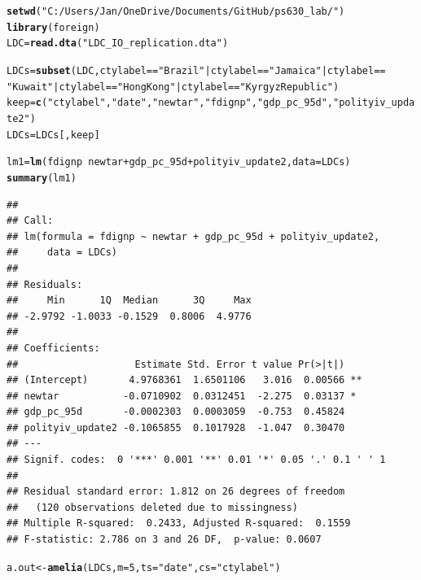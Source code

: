 \documentclass[12pt]{article}\usepackage[]{graphicx}\usepackage[]{color}
\makeatletter
\newcommand{\hlnum}[1]{\textcolor[rgb]{0.686,0.059,0.569}{#1}}%
\newcommand{\hlstr}[1]{\textcolor[rgb]{0.192,0.494,0.8}{#1}}%
\newcommand{\hlopt}[1]{\textcolor[rgb]{0,0,0}{#1}}%
\newcommand{\hlstd}[1]{\textcolor[rgb]{0.345,0.345,0.345}{#1}}%
\newcommand{\hlkwb}[1]{\textcolor[rgb]{0.69,0.353,0.396}{#1}}%
\newcommand{\hlkwc}[1]{\textcolor[rgb]{0.333,0.667,0.333}{#1}}%
\newcommand{\hlkwd}[1]{\textcolor[rgb]{0.737,0.353,0.396}{\textbf{#1}}}%
\newenvironment{kframe}{%
 \def\at@end@of@kframe{}%
 \ifinner\ifhmode%
  \def\at@end@of@kframe{\end{minipage}}%
  \begin{minipage}{\columnwidth}%
 \fi\fi%
 \def\FrameCommand##1{\hskip\@totalleftmargin \hskip-\fboxsep
 \colorbox{shadecolor}{##1}\hskip-\fboxsep
     \hskip-\linewidth \hskip-\@totalleftmargin \hskip\columnwidth}%
 \MakeFramed {\advance\hsize-\width
   \@totalleftmargin\z@ \linewidth\hsize
   \@setminipage}}%
 {\par\unskip\endMakeFramed%
 \at@end@of@kframe}
\newenvironment{knitrout}{}{} %
\makeatother
\begin{document}
\begin{knitrout}
\color{fgcolor}\begin{kframe}
\begin{alltt}
\hlkwd{setwd}\hlstd{(}\hlstr{"C:/Users/Jan/OneDrive/Documents/GitHub/ps630_lab/"}\hlstd{)}
\hlkwd{library}\hlstd{(foreign)}
\hlstd{LDC} \hlkwb{=} \hlkwd{read.dta}\hlstd{(}\hlstr{"LDC_IO_replication.dta"}\hlstd{)}

\hlstd{LDCs} \hlkwb{=} \hlkwd{subset}\hlstd{(LDC, ctylabel} \hlopt{==} \hlstr{"Brazil"} \hlopt{|} \hlstd{ctylabel} \hlopt{==} \hlstr{"Jamaica"} \hlopt{|} \hlstd{ctylabel} \hlopt{==}
    \hlstr{"Kuwait"} \hlopt{|} \hlstd{ctylabel} \hlopt{==} \hlstr{"HongKong"} \hlopt{|} \hlstd{ctylabel} \hlopt{==} \hlstr{"KyrgyzRepublic"}\hlstd{)}
\hlstd{keep} \hlkwb{=} \hlkwd{c}\hlstd{(}\hlstr{"ctylabel"}\hlstd{,} \hlstr{"date"}\hlstd{,} \hlstr{"newtar"}\hlstd{,} \hlstr{"fdignp"}\hlstd{,} \hlstr{"gdp_pc_95d"}\hlstd{,} \hlstr{"polityiv_update2"}\hlstd{)}
\hlstd{LDCs} \hlkwb{=} \hlstd{LDCs[, keep]}

\hlstd{lm1} \hlkwb{=} \hlkwd{lm}\hlstd{(fdignp} \hlopt{~} \hlstd{newtar} \hlopt{+} \hlstd{gdp_pc_95d} \hlopt{+} \hlstd{polityiv_update2,} \hlkwc{data} \hlstd{= LDCs)}
\hlkwd{summary}\hlstd{(lm1)}
\end{alltt}
\begin{verbatim}
## 
## Call:
## lm(formula = fdignp ~ newtar + gdp_pc_95d + polityiv_update2, 
##     data = LDCs)
## 
## Residuals:
##     Min      1Q  Median      3Q     Max 
## -2.9792 -1.0033 -0.1529  0.8006  4.9776 
## 
## Coefficients:
##                    Estimate Std. Error t value Pr(>|t|)   
## (Intercept)       4.9768361  1.6501106   3.016  0.00566 **
## newtar           -0.0710902  0.0312451  -2.275  0.03137 * 
## gdp_pc_95d       -0.0002303  0.0003059  -0.753  0.45824   
## polityiv_update2 -0.1065855  0.1017928  -1.047  0.30470   
## ---
## Signif. codes:  0 '***' 0.001 '**' 0.01 '*' 0.05 '.' 0.1 ' ' 1
## 
## Residual standard error: 1.812 on 26 degrees of freedom
##   (120 observations deleted due to missingness)
## Multiple R-squared:  0.2433,	Adjusted R-squared:  0.1559 
## F-statistic: 2.786 on 3 and 26 DF,  p-value: 0.0607
\end{verbatim}
\end{kframe}
\end{knitrout}



\begin{knitrout}
\color{fgcolor}\begin{kframe}
\begin{alltt}
\hlstd{a.out} \hlkwb{<-} \hlkwd{amelia}\hlstd{(LDCs,} \hlkwc{m} \hlstd{=} \hlnum{5}\hlstd{,} \hlkwc{ts} \hlstd{=} \hlstr{"date"}\hlstd{,} \hlkwc{cs} \hlstd{=} \hlstr{"ctylabel"}\hlstd{)}
\end{alltt}
\end{kframe}
\end{knitrout}
\end{document}
